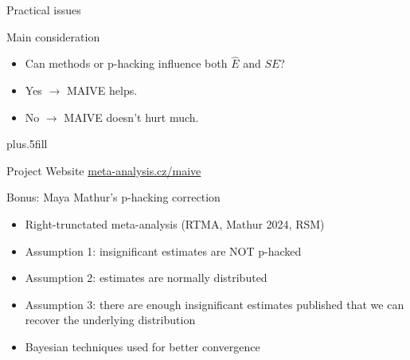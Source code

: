 \documentclass{beamer} %
\begin{document}
\begin{frame}{Practical issues}
  \begin{block}{Main consideration}
  \begin{itemize}
  \item Can methods or p-hacking influence both $\hat{E}$ and $SE$? %
	
	\item Yes $\rightarrow$ MAIVE helps. %
	
	\item No $\rightarrow$ MAIVE doesn't hurt much. %


  \end{itemize}
  \end{block}

\vskip0pt plus.5fill
    \begin{block}{Project Website}
      \href{http://www.meta-analysis.cz/maive}{meta-analysis.cz/maive}
    \end{block}
\end{frame}





\begin{frame}{Bonus: Maya Mathur's p-hacking correction}
\begin{itemize}
	\item Right-trunctated meta-analysis (RTMA, Mathur 2024, RSM)
	\item Assumption 1: insignificant estimates are NOT p-hacked
	\item Assumption 2: estimates are normally distributed
	\item Assumption 3: there are enough insignificant estimates published that we can recover the underlying distribution
	\item Bayesian techniques used for better convergence
\end{itemize}
\end{frame}
\end{document}
